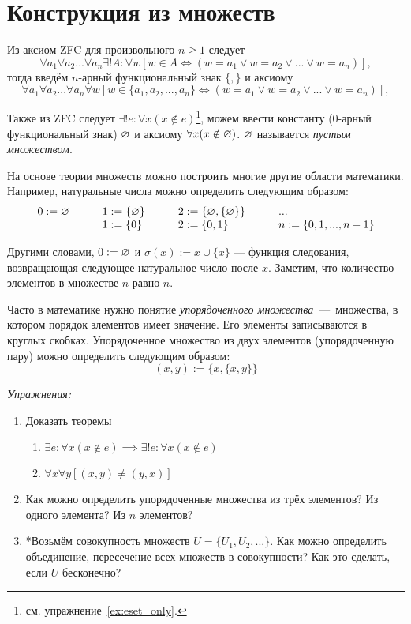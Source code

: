 \section{Конструкция из множеств}

Из аксиом ZFC для произвольного $n\geq 1$ следует
\[
	\forall a_1\forall a_2...\forall a_{n}\exists !A:\forall w
		[w\in A\iff (w=a_1\lor w=a_2\lor...\lor w=a_{n})],
\]
тогда введём $n$-арный функциональный знак $\{,\}$ и аксиому
\[
	\forall a_1\forall a_2...\forall a_{n}\forall w
	[w\in \{a_1,a_2,...,a_{n}\}\iff (w=a_1\lor w=a_2\lor...\lor w=a_{n})],
\]

Также из ZFC следует $\exists !e:\forall x(x\notin e)$\footnote{
	см. упражнение~\ref{ex:eset_only}.
}, можем ввести константу ($0$-арный функциональный знак) $\varnothing$
и аксиому $\forall x(x\notin \varnothing)$. $\varnothing$ называется {\it пустым множеством}.

На основе теории множеств можно построить многие другие области математики.
Например, натуральные числа можно определить следующим образом:
\[
	\begin{array}{llll}
		0  :=\varnothing\qquad & 1  :=\{\varnothing\}\qquad & 2  :=\{\varnothing,\{\varnothing\}\}\qquad & ... \\
		                 & 1:=\{0\}\qquad       & 2:=\{0,1\}
		                 & n:=\{0,1,...,n-1\}
	\end{array}
\]

Другими словами, ${0:=\varnothing}$ и $\sigma(x):=x\cup \{x\}$ --- функция следования,
возвращающая следующее натуральное число после $x$. Заметим, что количество элементов
в множестве $n$ равно $n$.

Часто в математике нужно понятие {\it упорядоченного множества}~---~множества,
в котором порядок элементов имеет значение. Его элементы записываются
в круглых скобках. Упорядоченное множество из двух элементов (упорядоченную пару)
можно определить следующим образом:
\[
	(x,y):=\{x,\{x,y\}\}
\]

\vspace{1em}
{\it Упражнения:}
\begin{enumerate}
	\item{}Доказать теоремы
	\begin{enumerate}
		\item{}$\exists e:\forall x(x\notin e)\implies
			\exists!e:\forall x(x\notin e)$\label{ex:eset_only}
		\item{}$\forall x\forall y[(x,y)\neq (y,x)]$
	\end{enumerate}

	\item{}Как можно определить упорядоченные множества из трёх элементов?
	Из одного элемента? Из $n$ элементов?

	\item{}*Возьмём совокупность множеств $U=\{U_{1},U_{2},...\}$.
	Как можно определить объединение, пересечение всех множеств в совокупности?
	Как это сделать, если $U$ бесконечно?
\end{enumerate}

\pagebreak
